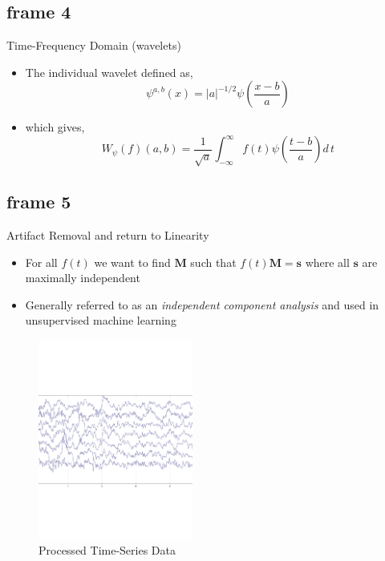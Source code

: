 \documentclass[xcolor=x11names,compress]{beamer}
\renewcommand{\(}{\begin{columns}}
\renewcommand{\)}{\end{columns}}
\newcommand{\<}[1]{\begin{column}{#1}}
\renewcommand{\>}{\end{column}}
\begin{document}

\subsection{frame 4}
\begin{frame}{Time-Frequency Domain (wavelets)}
\begin{itemize}
\item The individual wavelet defined as, $$\psi^{a,b}(x)=\left\vert a\right\vert^{-1/2}\psi \left(\frac{x-b}{a}\right)$$
\item which gives, $$W_{\psi}(f)(a,b)=\frac{1}{\sqrt{a}}\int_{-\infty}^{\infty}f(t)\psi \left(\frac{t-b}{a}\right)d\,t$$
\end{itemize}
\begin{center}
\end{center}
\end{frame}


\subsection{frame 5}
\begin{frame}{Artifact Removal and return to Linearity}
\begin{itemize}
\item For all $f(t)$ we want to find $\mathbf{M}$ such that $f(t)\mathbf{M}=\mathbf{s}$ where all $\mathbf{s}$ are maximally independent
\item Generally referred to as an \textit{independent component analysis} and used in unsupervised machine learning
\end{itemize}
\begin{figure}[h] 
   \centering
   \includegraphics[width=2in]{Time_Series.pdf} 
   \caption{Processed Time-Series Data}
   \label{fig:example}
\end{figure}
\end{frame}
\end{document}
